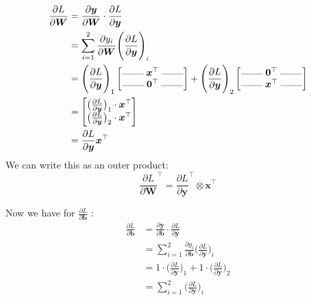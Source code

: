 \documentclass[11pt]{article}
\newcommand{\0}{\mat{0}}
\newcommand{\matr}[1]{\bm{#1}}     %
\newcommand{\vect}[1]{\bm{#1}}     %
\begin{document}
\begin{align*}
	\frac{ \partial L}{\partial \matr{W}} &= \frac{ \partial \vect{y}}{\partial \matr{W}} \cdot \frac{ \partial L}{\partial \vect{y}} \\
	&= \sum_{i=1}^2 \frac{ \partial y_i}{\partial \matr{W}} \Bigg( \frac{ \partial L}{\partial \vect{y}} \Bigg)_i \\
	&=  \Bigg( \frac{ \partial L}{\partial \vect{y}} \Bigg)_1 
		\begin{bmatrix}
   			\rule[0.5mm]{0.8cm}{0.1mm} \; \vect{x}^{\top} \; \rule[0.5mm]{0.8cm}{0.1mm} \\
   			\rule[0.5mm]{0.8cm}{0.1mm} \; \vect{0}^{\top} \; \rule[0.5mm]{0.8cm}{0.1mm} \\
		\end{bmatrix} + 
		\Bigg( \frac{ \partial L}{\partial \vect{y}} \Bigg)_2
		\begin{bmatrix}
   			\rule[0.5mm]{0.8cm}{0.1mm} \; \vect{0}^{\top} \; \rule[0.5mm]{0.8cm}{0.1mm} \\
   			\rule[0.5mm]{0.8cm}{0.1mm} \; \vect{x}^{\top} \; \rule[0.5mm]{0.8cm}{0.1mm} \\
		\end{bmatrix} \\
	&=  \begin{bmatrix}
		\big(\frac{ \partial L}{\partial \vect{y}}\big)_1  \cdot \vect{x}^{\top} \\
		\big(\frac{ \partial L}{\partial \vect{y}}\big)_2  \cdot \vect{x}^{\top}  \\
	      \end{bmatrix} \\
	&= \frac{ \partial L}{\partial \vect{y}} \vect{x}^{\top}
\end{align*}
We can write this as an outer product:
\begin{equation*}
    \frac{ \partial L}{\partial \matr{W}}^\top = \frac{ \partial L}{\partial \vect{y}}^\top \otimes \vect{x}^{\top}
\end{equation*}

Now we have for  $\frac{ \partial L}{\partial \vect{b}}$ :
\begin{align*}
	\frac{ \partial L}{\partial \vect{b}} &= \frac{ \partial \vect{y}} {\partial \vect{b}} \cdot \frac{ \partial L}{\partial \vect{y}}  \\
	&= \sum_{i=1}^2 \frac{ \partial y_i}{\partial \vect{b}}  \Bigg( \frac{ \partial L}{\partial \vect{y}} \Bigg)_i \\
	&= 1 \cdot \Bigg( \frac{ \partial L}{\partial \vect{y}} \Bigg)_1 + 1 \cdot \Bigg( \frac{ \partial L}{\partial \vect{y}} \Bigg)_2 \\
	&=  \sum_{i=1}^2  \Bigg( \frac{ \partial L}{\partial \vect{y}} \Bigg)_i
\end{align*}
\end{document}
